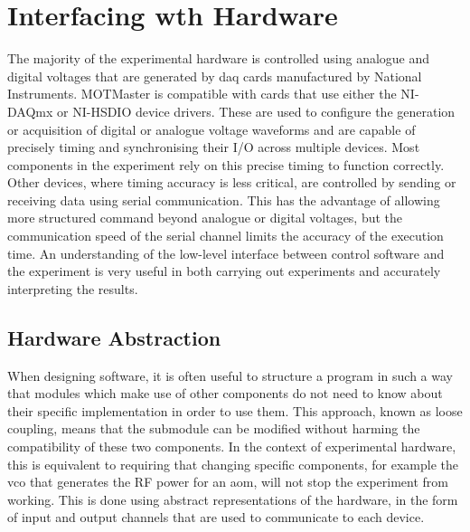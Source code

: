 \section{Interfacing wth Hardware}
The majority of the experimental hardware is controlled using analogue and
digital voltages that are generated by \ac{daq} cards manufactured by
National Instruments. MOTMaster is compatible with cards that use either the
NI-DAQmx or NI-HSDIO device drivers. These are used to configure the
generation or acquisition of digital or analogue voltage waveforms and are
capable of precisely timing and synchronising their I/O across multiple
devices. Most components in the experiment rely on this precise timing to
function correctly. Other devices, where timing accuracy is less critical,
are controlled by sending or receiving data using serial communication. This
has the advantage of allowing more structured command beyond analogue or
digital voltages, but the communication speed of the serial channel limits
the accuracy of the execution time. An understanding of the low-level
interface between control software and the experiment is very useful in both
carrying out experiments and accurately interpreting the results.
\subsection{Hardware Abstraction}\label{subsec:compinterface_hwabstraction}
When designing software, it is often useful to structure a program in such a
way that modules which make use of other components do not need to know about
their specific implementation in order to use them. This approach, known as
loose coupling, means that the submodule can be modified without harming the
compatibility of these two components. In the context of experimental
hardware, this is equivalent to requiring that changing specific components,
for example the \ac{vco} that generates the RF power for an \ac{aom}, will
not stop the experiment from working. This is done using abstract
representations of the hardware, in the form of input and output channels
that are used to communicate to each device. 
